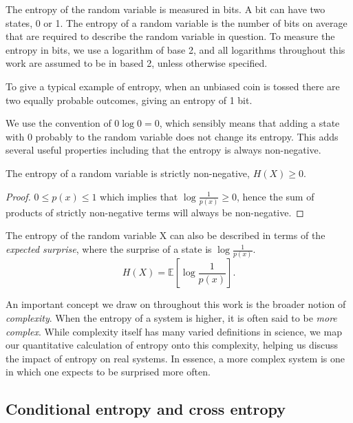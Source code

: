 The entropy of the random variable is measured in bits. A bit can have two states, 0 or 1. The entropy of a random variable is the number of bits on average that are required to describe the random variable in question. To measure the entropy in bits, we use a logarithm of base 2, and all logarithms throughout this work are assumed to be in based 2, unless otherwise specified.

To give a typical example of entropy, when an unbiased coin is tossed there are two equally probable outcomes, giving an entropy of 1 bit. 

\begin{remark}
We use the convention of $0\log 0 = 0$, which sensibly means that adding a state with 0 probably to the random variable does not change its entropy. This adds several useful properties including that the entropy is always non-negative.
\end{remark}

\begin{lemma}
	The entropy of a random variable is strictly non-negative, $H(X) \geq 0$.
\end{lemma}

\begin{proof}
	$0 \leq p(x) \leq 1$ which implies that $\log \frac{1}{p(x)} \geq 0$,
	hence the sum of products of strictly non-negative terms will always be non-negative. 
\end{proof}

\begin{remark}
	The entropy of the random variable X can also be described in terms of the \emph{expected surprise}, where the surprise of a state is $\log \frac{1}{p(x)}$.
	\begin{equation}
		H(X) = \mathbb{E} \left[ \log  \frac{1}{p(x)} \right].
	\end{equation}
\end{remark}	

An important concept we draw on throughout this work is the broader notion of \emph{complexity}. When the entropy of a system is higher, it is often said to be \emph{more complex}. While complexity itself has many varied definitions in science, we map our quantitative calculation of entropy onto this complexity, helping us discuss the impact of entropy on real systems. In essence, a more complex system is one in which one expects to be surprised more often.

\subsection{Conditional entropy and cross entropy}

